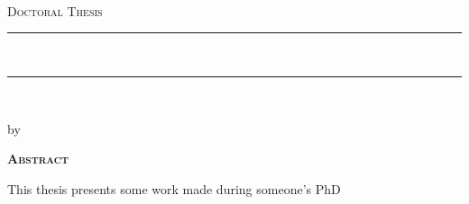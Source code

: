 
\thispagestyle{empty}

\begin{center}

    {\normalsize \href{http://www.sussex.ac.uk/}{\myUni} \\} %
    {\normalsize \myFaculty \\} %
    {\normalsize \myDepartment \\} %
    \bigskip\vspace*{.02\textheight}
    {\Large \textsc{Doctoral Thesis}}\par
    \bigskip
    
    {\rule{\linewidth}{1pt}\\%
    \Large \myTitle \par} %
    \rule{\linewidth}{1pt}\\[0.4cm]
    
    \bigskip
	{\normalsize by \myName \par} %
    \bigskip\vspace*{.06\textheight}
\end{center}

    {\centering\Huge\textsc{\textbf{Abstract}} \par}
    \bigskip



    \noindent This thesis presents some work made during someone's PhD


